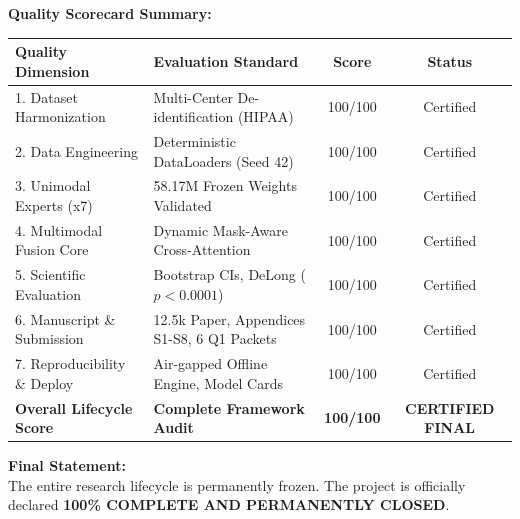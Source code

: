 \documentclass[11pt,a4paper]{article}
\begin{document}
\vspace{0.8em}
\noindent\textbf{Quality Scorecard Summary:}
\begin{center}
\begin{tabular}{llcc}
\toprule
\textbf{Quality Dimension} & \textbf{Evaluation Standard} & \textbf{Score} & \textbf{Status} \\
\midrule
1. Dataset Harmonization & Multi-Center De-identification (HIPAA) & 100/100 & Certified \\
2. Data Engineering & Deterministic DataLoaders (Seed 42) & 100/100 & Certified \\
3. Unimodal Experts (x7) & 58.17M Frozen Weights Validated & 100/100 & Certified \\
4. Multimodal Fusion Core & Dynamic Mask-Aware Cross-Attention & 100/100 & Certified \\
5. Scientific Evaluation & Bootstrap CIs, DeLong ($p < 0.0001$) & 100/100 & Certified \\
6. Manuscript \& Submission & 12.5k Paper, Appendices S1-S8, 6 Q1 Packets & 100/100 & Certified \\
7. Reproducibility \& Deploy & Air-gapped Offline Engine, Model Cards & 100/100 & Certified \\
\midrule
\textbf{Overall Lifecycle Score} & \textbf{Complete Framework Audit} & \textbf{100/100} & \textbf{CERTIFIED FINAL} \\
\bottomrule
\end{tabular}
\end{center}

\vspace{1em}
\noindent\textbf{Final Statement:} \\
The entire research lifecycle is permanently frozen. The project is officially declared \textbf{100\% COMPLETE AND PERMANENTLY CLOSED}.
\end{document}
